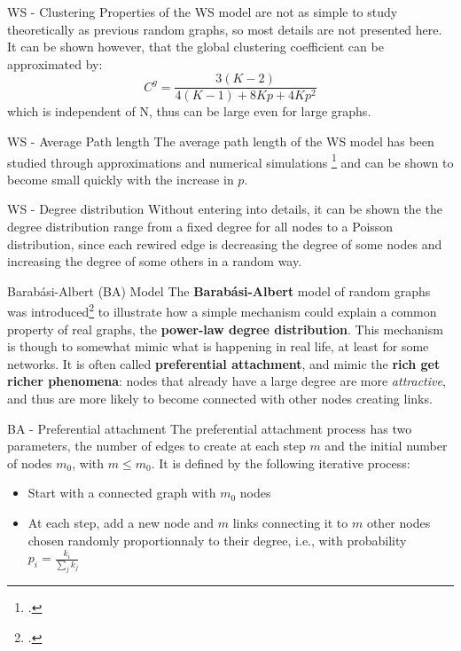 \documentclass[a4paper,11pt]{book}
\begin{document}
\begin{textbox}{WS - Clustering}
Properties of the WS model are not as simple to study theoretically as previous random graphs, so most details are not presented here.
It can be shown however, that the global clustering coefficient can be approximated by:
\[
C^g=\frac{3(K-2)}{4(K-1)+8Kp+4Kp^2}
\]
which is independent of N, thus can be large even for large graphs.
\end{textbox}


\begin{textbox}{WS - Average Path length}
The average path length of the WS model has been studied through approximations and numerical simulations \footcite{newman2000models} and can be shown to become small quickly with the increase in $p$.
\end{textbox}





\begin{textbox}{WS - Degree distribution}
Without entering into details, it can be shown the the degree distribution range from a fixed degree for all nodes to a Poisson distribution, since each rewired edge is decreasing the degree of some nodes and increasing the degree of some others in a random way.
\end{textbox}





\begin{textbox}{Barabási-Albert (BA) Model}
The \textbf{Barabási-Albert} model of random graphs was introduced\footcite{barabasi1999emergence} to illustrate how a simple mechanism could explain a common property of real graphs, the \textbf{power-law degree distribution}.
This mechanism is though to somewhat mimic what is happening in real life, at least for some networks. It is often called \textbf{preferential attachment}, and mimic the \textbf{rich get richer phenomena}: nodes that already have a large degree are more \textit{attractive}, and thus are more likely to become connected with other nodes creating links.
\end{textbox}




\begin{textbox}{BA - Preferential attachment }
The preferential attachment process has two parameters, the number of edges to create at each step $m$ and the initial number of nodes $m_0$, with $m\leq m_0$. It is defined by the following iterative process:
\begin{itemize}
    \item Start with a connected graph with $m_0$ nodes
    \item At each step, add a new node and $m$ links connecting it to $m$ other nodes chosen randomly proportionnaly to their degree, i.e., with probability $p_i=\frac{k_i}{\sum_j k_j}$
\end{itemize}
\end{textbox}
\end{document}
